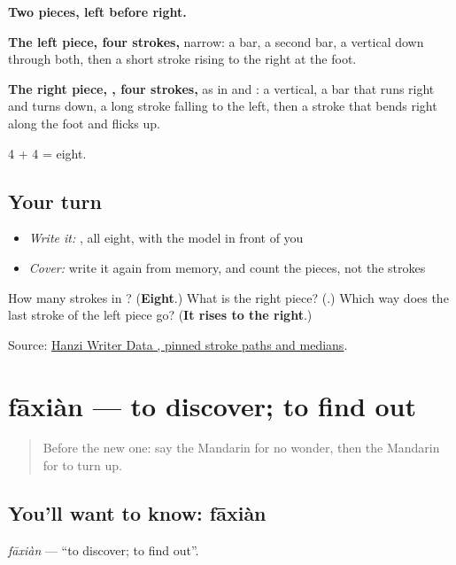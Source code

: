 \begin{quote}
\end{quote}

\textbf{Two pieces, left before right.}

\textbf{The left piece, four strokes,} narrow: a bar, a second bar, a vertical down through both, then a short stroke rising to the right at the foot.

\textbf{The right piece, , four strokes,} as in  and : a vertical, a bar that runs right and turns down, a long stroke falling to the left, then a stroke that bends right along the foot and flicks up.

4 + 4 = eight.

\subsection*{Your turn}
\begin{itemize}
\raggedright
  \item \emph{Write it:} , all eight, with the model in front of you
  \item \emph{Cover:} write it again from memory, and count the pieces, not the strokes
\end{itemize}

\begin{tcolorbox}[breakable,colback=teal!4,colframe=teal!35!black,title={Before you move on}]
How many strokes in ? (\textbf{Eight}.) What is the right piece? (\textbf{}.) Which way does the last stroke of the left piece go? (\textbf{It rises to the right}.)

Source: \href{https://raw.githubusercontent.com/chanind/hanzi-writer-data/68d10a4b21150cae5e1ebbd223eed289cf32d90c/data/\%E7\%8E\%B0.json}{Hanzi Writer Data , pinned stroke paths and medians}.
\end{tcolorbox}
\section[fāxiàn]{fāxiàn — to discover; to find out}

\label{lesson:ZH-C236-faxian}



\begin{quote}
Before the new one: say the Mandarin for no wonder, then the Mandarin for to turn up.
\end{quote}

\subsection*{You'll want to know: fāxiàn}
\emph{fāxiàn} — \textquotedblleft{}to discover; to find out\textquotedblright{}.

